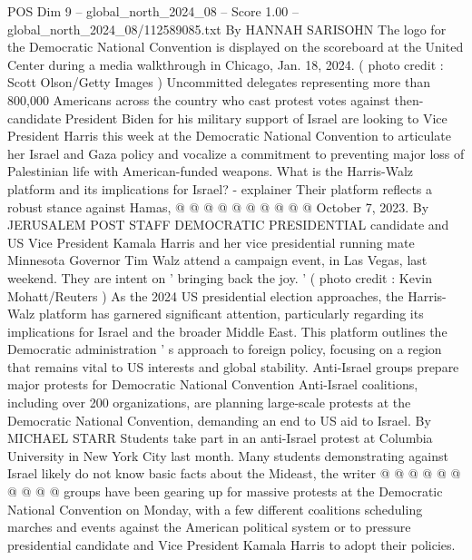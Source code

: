 \begin{textsample}{POS Dim 9 – global\_north\_2024\_08 – Score 1.00 – global\_north\_2024\_08/112589085.txt}
By HANNAH SARISOHN The logo for the Democratic National Convention is displayed on the scoreboard at the United Center during a media walkthrough in Chicago, Jan. 18, 2024. ( photo credit : Scott Olson/Getty Images ) Uncommitted delegates representing more than 800,000 Americans across the country who cast protest votes against then-candidate President Biden for his military support of Israel are looking to Vice President Harris this week at the Democratic National Convention to articulate her Israel and Gaza policy and vocalize a commitment to preventing major loss of Palestinian life with American-funded weapons.
What is the Harris-Walz platform and its implications for Israel? - explainer Their platform reflects a robust stance against Hamas, @ @ @ @ @ @ @ @ @ @ October 7, 2023.
By JERUSALEM POST STAFF DEMOCRATIC PRESIDENTIAL candidate and US Vice President Kamala Harris and her vice presidential running mate Minnesota Governor Tim Walz attend a campaign event, in Las Vegas, last weekend.
They are intent on ' bringing back the joy. ' ( photo credit : Kevin Mohatt/Reuters ) As the 2024 US presidential election approaches, the Harris-Walz platform has garnered significant attention, particularly regarding its implications for Israel and the broader Middle East.
This platform outlines the Democratic administration ' s approach to foreign policy, focusing on a region that remains vital to US interests and global stability.
Anti-Israel groups prepare major protests for Democratic National Convention Anti-Israel coalitions, including over 200 organizations, are planning large-scale protests at the Democratic National Convention, demanding an end to US aid to Israel.
By MICHAEL STARR Students take part in an anti-Israel protest at Columbia University in New York City last month.
Many students demonstrating against Israel likely do not know basic facts about the Mideast, the writer @ @ @ @ @ @ @ @ @ @ groups have been gearing up for massive protests at the Democratic National Convention on Monday, with a few different coalitions scheduling marches and events against the American political system or to pressure presidential candidate and Vice President Kamala Harris to adopt their policies.

\end{textsample}
